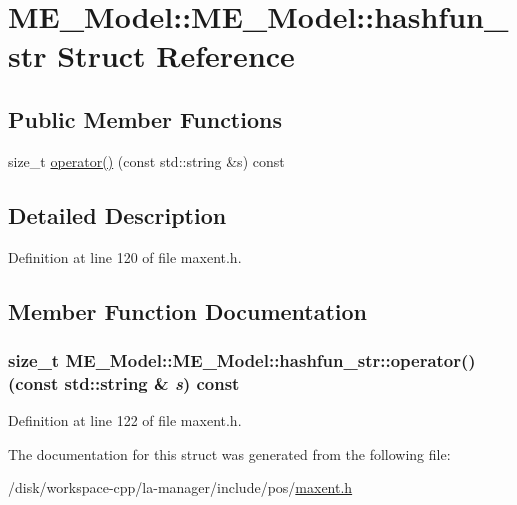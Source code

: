 \hypertarget{structME__Model_1_1hashfun__str}{
\section{ME\_\-Model::ME\_\-Model::hashfun\_\-str Struct Reference}
\label{structME__Model_1_1hashfun__str}
}
\subsection*{Public Member Functions}
\begin{CompactItemize}
\item 
size\_\-t \hyperlink{structME__Model_1_1hashfun__str_0ce972a0bcb29c7342cb7354e0c4a168}{operator()} (const std::string \&s) const 
\end{CompactItemize}


\subsection{Detailed Description}


Definition at line 120 of file maxent.h.

\subsection{Member Function Documentation}
\hypertarget{structME__Model_1_1hashfun__str_0ce972a0bcb29c7342cb7354e0c4a168}{
\subsubsection[{operator()}]{\setlength{\rightskip}{0pt plus 5cm}size\_\-t ME\_\-Model::ME\_\-Model::hashfun\_\-str::operator() (const std::string \& {\em s}) const}}
\label{structME__Model_1_1hashfun__str_0ce972a0bcb29c7342cb7354e0c4a168}




Definition at line 122 of file maxent.h.

The documentation for this struct was generated from the following file:\begin{CompactItemize}
\item 
/disk/workspace-cpp/la-manager/include/pos/\hyperlink{maxent_8h}{maxent.h}\end{CompactItemize}
